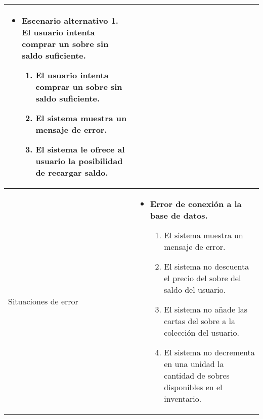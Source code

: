 \begin{longtable}{
    >{\columncolor{lightgreen!20}}p{4cm}
    p{12cm}
    }
\begin{itemize}[nosep,leftmargin=*]
        \item \textbf{Escenario alternativo 1. El usuario intenta comprar un sobre sin saldo suficiente.}
        \begin{enumerate}[nosep,leftmargin=*]
            \item El usuario intenta comprar un sobre sin saldo suficiente.
            \item El sistema muestra un mensaje de error.
            \item El sistema le ofrece al usuario la posibilidad de recargar saldo.
        \end{enumerate}
    \end{itemize} \\
    \midrule
    Situaciones de error & 
    \begin{itemize}[nosep,leftmargin=*]
        \item \textbf{Error de conexión a la base de datos.}
        \begin{enumerate}[nosep,leftmargin=*]
            \item El sistema muestra un mensaje de error.
            \item El sistema no descuenta el precio del sobre del saldo del usuario.
            \item El sistema no añade las cartas del sobre a la colección del usuario.
            \item El sistema no decrementa en una unidad la cantidad de sobres disponibles en el inventario.
        \end{enumerate}
    \end{itemize} \\
\end{longtable}



